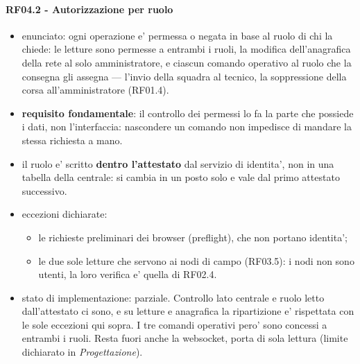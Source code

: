 \documentclass[11pt]{article}
\begin{document}
\paragraph{RF04.2 - Autorizzazione per ruolo}
\label{sec:orgc637dbf}
\begin{itemize}
\item enunciato: ogni operazione e' permessa o negata in base al ruolo di chi la chiede: le letture sono
permesse a entrambi i ruoli, la modifica dell'anagrafica della rete al solo amministratore, e
ciascun comando operativo al ruolo che la consegna gli assegna — l'invio della squadra al tecnico,
la soppressione della corsa all'amministratore (RF01.4).
\item \textbf{requisito fondamentale}: il controllo dei permessi lo fa la parte che possiede i dati, non
l'interfaccia: nascondere un comando non impedisce di mandare la stessa richiesta a mano.
\item il ruolo e' scritto \textbf{dentro l'attestato} dal servizio di identita', non in una tabella della
centrale: si cambia in un posto solo e vale dal primo attestato successivo.
\item eccezioni dichiarate:
\begin{itemize}
\item le richieste preliminari dei browser (preflight), che non portano identita';
\item le due sole letture che servono ai nodi di campo (RF03.5): i nodi non sono utenti, la loro
verifica e' quella di RF02.4.
\end{itemize}
\item stato di implementazione: parziale. Controllo lato centrale e ruolo letto dall'attestato ci sono,
e su letture e anagrafica la ripartizione e' rispettata con le sole eccezioni qui sopra. I tre
comandi operativi pero' sono concessi a entrambi i ruoli. Resta fuori anche la websocket, porta di
sola lettura (limite dichiarato in \emph{Progettazione}).
\end{itemize}
\end{document}
